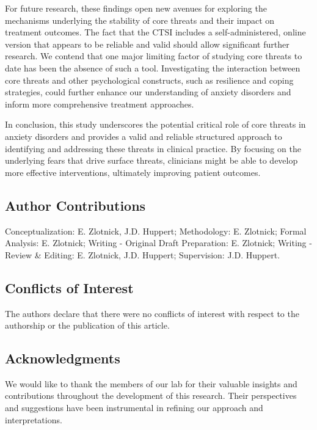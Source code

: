 \documentclass[
  man,floatsintext]{apa7}
\begin{document}
For future research, these findings open new avenues for exploring the mechanisms underlying the stability of core threats and their impact on treatment outcomes.
The fact that the CTSI includes a self-administered, online version that appears to be reliable and valid should allow significant further research.
We contend that one major limiting factor of studying core threats to date has been the absence of such a tool.
Investigating the interaction between core threats and other psychological constructs, such as resilience and coping strategies, could further enhance our understanding of anxiety disorders and inform more comprehensive treatment approaches.

In conclusion, this study underscores the potential critical role of core threats in anxiety disorders and provides a valid and reliable structured approach to identifying and addressing these threats in clinical practice.
By focusing on the underlying fears that drive surface threats, clinicians might be able to develop more effective interventions, ultimately improving patient outcomes.

\newpage

\subsection{Author Contributions}\label{author-contributions}

Conceptualization: E. Zlotnick, J.D. Huppert;
Methodology: E. Zlotnick;
Formal Analysis: E. Zlotnick;
Writing - Original Draft Preparation: E. Zlotnick;
Writing - Review \& Editing: E. Zlotnick, J.D. Huppert;
Supervision: J.D. Huppert.

\subsection{Conflicts of Interest}\label{conflicts-of-interest}

The authors declare that there were no conflicts of interest with respect to the authorship or the publication of this article.

\subsection{Acknowledgments}\label{acknowledgments}

We would like to thank the members of our lab for their valuable insights and contributions throughout the development of this research.
Their perspectives and suggestions have been instrumental in refining our approach and interpretations.
\end{document}
